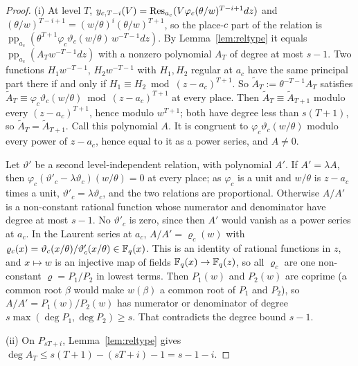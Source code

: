 \begin{proof}
(i) At level $T$, $y_{c,T-i}(V)=\operatorname{Res}_{a_c}(V\varphi_c(\theta/w)^{T-i+1}dz)$ and $(\theta/w)^{T-i+1}=(w/\theta)^i(\theta/w)^{T+1}$, so the place-$c$ part of the relation is $\operatorname{pp}_{a_c}(\theta^{T+1}\varphi_c\vartheta_c(w/\theta)\,w^{-T-1}dz)$. By Lemma~\ref{lem:reltype} it equals $\operatorname{pp}_{a_c}(A_Tw^{-T-1}dz)$ with a nonzero polynomial $A_T$ of degree at most $s-1$. Two functions $H_1w^{-T-1}$, $H_2w^{-T-1}$ with $H_1,H_2$ regular at $a_c$ have the same principal part there if and only if $H_1\equiv H_2\bmod(z-a_c)^{T+1}$. So $\tilde A_T:=\theta^{-T-1}A_T$ satisfies $\tilde A_T\equiv\varphi_c\vartheta_c(w/\theta)\bmod(z-a_c)^{T+1}$ at every place. Then $\tilde A_T\equiv\tilde A_{T+1}$ modulo every $(z-a_c)^{T+1}$, hence modulo $w^{T+1}$; both have degree less than $s(T+1)$, so $\tilde A_T=\tilde A_{T+1}$. Call this polynomial $A$. It is congruent to $\varphi_c\vartheta_c(w/\theta)$ modulo every power of $z-a_c$, hence equal to it as a power series, and $A\ne0$.

Let $\vartheta'$ be a second level-independent relation, with polynomial $A'$. If $A'=\lambda A$, then $\varphi_c(\vartheta'_c-\lambda\vartheta_c)(w/\theta)=0$ at every place; as $\varphi_c$ is a unit and $w/\theta$ is $z-a_c$ times a unit, $\vartheta'_c=\lambda\vartheta_c$, and the two relations are proportional. Otherwise $A/A'$ is a non-constant rational function whose numerator and denominator have degree at most $s-1$. No $\vartheta'_c$ is zero, since then $A'$ would vanish as a power series at $a_c$. In the Laurent series at $a_c$, $A/A'=\varrho_c(w)$ with $\varrho_c(x)=\vartheta_c(x/\theta)/\vartheta'_c(x/\theta)\in\mathbb{F}_q(x)$. This is an identity of rational functions in $z$, and $x\mapsto w$ is an injective map of fields $\mathbb{F}_q(x)\to\mathbb{F}_q(z)$, so all $\varrho_c$ are one non-constant $\varrho=P_1/P_2$ in lowest terms. Then $P_1(w)$ and $P_2(w)$ are coprime (a common root $\beta$ would make $w(\beta)$ a common root of $P_1$ and $P_2$), so $A/A'=P_1(w)/P_2(w)$ has numerator or denominator of degree $s\max(\deg P_1,\deg P_2)\ge s$. That contradicts the degree bound $s-1$.

(ii) On $P_{sT+i}$, Lemma~\ref{lem:reltype} gives $\deg A_T\le s(T+1)-(sT+i)-1=s-1-i$.


\end{proof}
